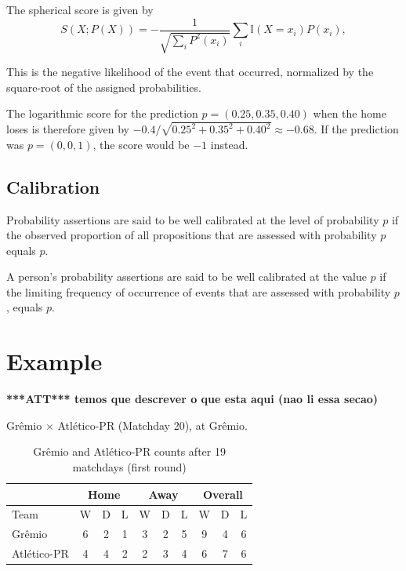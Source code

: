 \documentclass[journal,article,accept,moreauthors,pdftex,12pt,a4paper]{mdpi}
\newcommand{\red}[1]{\textbf{\color{red} ***ATT*** #1}}
\begin{document}
The spherical score is given by
$$S(X;P(X))=- \frac{1}{\sqrt{\sum_i P^2(x_i)}}\sum_{i}\mathbb{I}(X=x_i)P(x_i),$$

This is the negative likelihood
of the event that occurred, normalized by the square-root of the assigned probabilities.

The logarithmic score for the prediction $p=(0.25,0.35,0.40)$ when the home loses is therefore given by
$-0.4/\sqrt{0.25^2+0.35^2+0.40^2} \approx -0.68$. If the prediction was
 $p=(0,0,1)$, the score would be $-1$ instead.


\subsection{Calibration}

Probability assertions are said to be well calibrated at the level of probability $p$ if the observed proportion of all propositions that are assessed with probability $p$ equals $p$.

A person's probability assertions are said to be well calibrated at the value $p$ if the limiting frequency of occurrence of events that are assessed with probability $p$, equals $p$.


\section{Example}

\red{temos que descrever o que esta aqui (nao li essa secao)}

Gr\^emio $\times$ Atl\'etico-PR (Matchday 20), at Gr\^emio.

\begin{table}[h]
\begin{center}
\begin{tabular}{lccccccccc}

\hline
 & \multicolumn{3}{c}{Home} & \multicolumn{3}{c}{Away}& \multicolumn{3}{c}{Overall} \\
\hline
\hline
Team & W & D & L & W & D & L & W & D & L\\
\hline
Gr\^emio & 6 & 2 & 1 & 3 & 2 & 5 & 9 & 4 & 6\\
Atl\'etico-PR & 4 & 4 & 2 & 2 & 3 & 4 & 6 & 7 & 6\\
\hline
\end{tabular}
\caption{Gr\^emio and Atl\'etico-PR counts after 19 matchdays (first round)}
\end{center}
\end{table}
\end{document}
